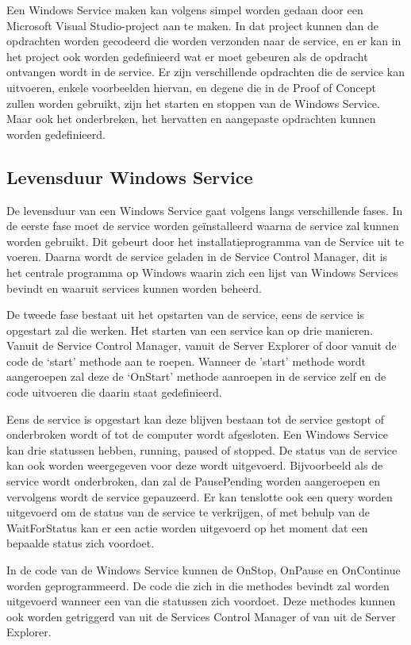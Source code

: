 Een Windows Service maken kan volgens \textcite{DevMozService} simpel worden gedaan door een Microsoft Visual Studio-project aan te maken. In dat project kunnen dan de opdrachten worden gecodeerd die worden verzonden naar de service, en er kan in het project ook worden gedefinieerd wat er moet gebeuren als de opdracht ontvangen wordt in de service. Er zijn verschillende opdrachten die de service kan uitvoeren, enkele voorbeelden hiervan, en degene die in de Proof of Concept zullen worden gebruikt, zijn het starten en stoppen van de Windows Service. Maar ook het onderbreken, het hervatten en aangepaste opdrachten kunnen worden gedefinieerd. 

\subsection{Levensduur Windows Service}
De levensduur van een Windows Service gaat volgens \textcite{DevMozService} langs verschillende fases. In de eerste fase moet de service worden geïnstalleerd waarna de service zal kunnen worden gebruikt. Dit gebeurt door het installatieprogramma van de Service uit te voeren. Daarna wordt de service geladen in de Service Control Manager, dit is het centrale programma op Windows waarin zich een lijst van Windows Services bevindt en waaruit services kunnen worden beheerd. 

De tweede fase bestaat uit het opstarten van de service, eens de service is opgestart zal die werken. Het starten van een service kan op drie manieren. Vanuit de Service Control Manager, vanuit de Server Explorer of door vanuit de code de ‘start’ methode aan te roepen. Wanneer de 'start’ methode wordt aangeroepen zal deze de ‘OnStart’ methode aanroepen in de service zelf en de code uitvoeren die daarin staat gedefinieerd. 

Eens de service is opgestart kan deze blijven bestaan tot de service gestopt of onderbroken wordt of tot de computer wordt afgesloten. Een Windows Service kan drie statussen hebben, running, paused of stopped. De status van de service kan ook worden weergegeven voor deze wordt uitgevoerd. Bijvoorbeeld als de service wordt onderbroken, dan zal de PausePending worden aangeroepen en vervolgens wordt de service gepauzeerd. Er kan tenslotte ook een query worden uitgevoerd om de status van de service te verkrijgen, of met behulp van de WaitForStatus kan er een actie worden uitgevoerd op het moment dat een bepaalde status zich voordoet. 

In de code van de Windows Service kunnen de OnStop, OnPause en OnContinue worden geprogrammeerd. De code die zich in die methodes bevindt zal worden uitgevoerd wanneer een van die statussen zich voordoet. Deze methodes kunnen ook worden getriggerd van uit de Services Control Manager of van uit de Server Explorer.

